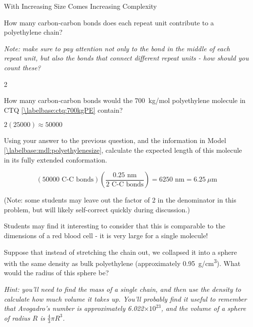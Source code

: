 \begin{activity}{With Increasing Size Comes Increasing Complexity}
\begin{ctqs}

	\question How many carbon-carbon bonds does each repeat unit contribute to a polyethylene chain?
	
		\emph{Note: make sure to pay attention not only to the bond in the middle of each repeat unit, but also the bonds that connect different repeat units - how should you count these?}
		
		\begin{solution}[1in]
			2
		\end{solution}
	
	\question How many carbon-carbon bonds would the 700~kg/mol polyethylene molecule in CTQ \ref{\labelbase:ctq:700kgPE} contain?
		
		\begin{solution}[1in]
			$2(25000)\approx 50000$
		\end{solution}
	
	\question Using your answer to the previous question, and the information in Model \ref{\labelbase:mdl:polyethylenesize}, calculate the expected length of this molecule in its fully extended conformation. \label{\labelbase:ctq:extendedPE}
		
		\begin{solution}[2in]
			\begin{equation*}
				\left(50000\text{ C-C bonds}\right)\left(\frac{0.25\text{ nm}}{2\text{ C-C bonds}}\right) = 6250\text{ nm} = 6.25~\mu\text{m}
			\end{equation*}
			
			(Note: some students may leave out the factor of 2 in the denominator in this problem, but will likely self-correct quickly during discussion.)
			
			Students may find it interesting to consider that this is comparable to the dimensions of a red blood cell - it is very large for a single molecule!
		\end{solution}
	
	\question Suppose that instead of stretching the chain out, we collapsed it into a sphere with the same density as bulk polyethylene (approximately 0.95~g/cm\textsuperscript{3}).  What would the radius of this sphere be? \label{\labelbase:ctq:collapsedPE}
	
		\emph{Hint: you'll need to find the mass of a single chain, and then use the density to calculate how much volume it takes up.  You'll probably find it useful to remember that Avogadro's number is approximately 6.022$\times 10^{23}$, and the volume of a sphere of radius $R$ is $\frac{4}{3}\pi R^3$.}
		

\end{ctqs}
\end{activity}
